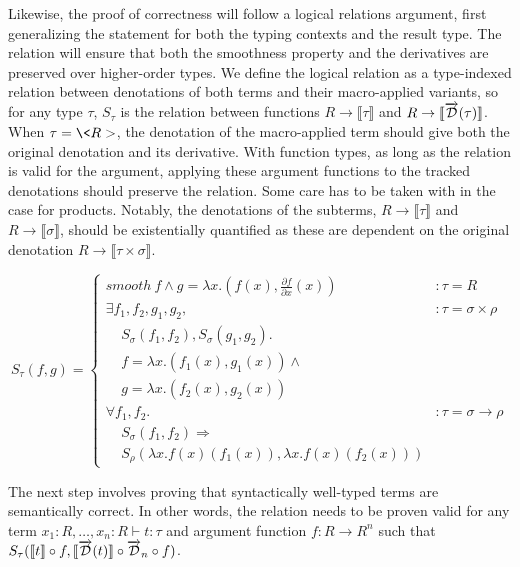   Likewise, the proof of correctness will follow a logical relations argument, first generalizing the statement for both the typing contexts and the result type.
  The relation will ensure that both the smoothness property and the derivatives are preserved over higher-order types.
  We define the logical relation as a type-indexed relation between denotations of both terms and their macro-applied variants, so for any type $\tau$, $S_\tau$ is the relation between functions $R \rightarrow \llbracket \tau \rrbracket$ and $R \rightarrow \llbracket \overrightarrow{\mathcal{D}}(\tau) \rrbracket$.
  When $\tau = \<R>$, the denotation of the macro-applied term should give both the original denotation and its derivative.
  With function types, as long as the relation is valid for the argument, applying these argument functions to the tracked denotations should preserve the relation.
  Some care has to be taken with in the case for products.
  Notably, the denotations of the subterms, $R \rightarrow \llbracket \tau \rrbracket$ and $R \rightarrow \llbracket \sigma \rrbracket$, should be existentially quantified as these are dependent on the original denotation $R \rightarrow \llbracket \tau \times \sigma \rrbracket$.

  \begin{equation}
    S_\tau(f, g) =
      \left\{
        \begin{array}{ll}
          smooth\ f \wedge
            g = \lambda x. (f(x), \frac{\partial f}{\partial x}(x))
            & : \tau = R \\
          \exists f_1, f_2, g_1, g_2,
            & : \tau = \sigma \times \rho \\
            \;\;\;\;S_\sigma(f_1, f_2), S_\sigma(g_1, g_2). \\
            \;\;\;\;f = \lambda x. (f_1(x), g_1(x)) \wedge \\
            \;\;\;\;g = \lambda x. (f_2(x), g_2(x)) \\
          \forall f_1, f_2.
            & : \tau = \sigma \rightarrow \rho \\
            \;\;\;\;S_\sigma(f_1, f_2) \Rightarrow \\
            \;\;\;\;S_\rho(\lambda x. f(x)(f_1(x)),\lambda x. f(x)(f_2(x)))
        \end{array}
      \right.
  \label{eqn:lr_base}
  \end{equation}

  The next step involves proving that syntactically well-typed terms are semantically correct.
  In other words, the relation needs to be proven valid for any term $x_1 : R, \dots, x_n : R \vdash t : \tau$ and argument function $f : R \rightarrow R^n$ such that $S_\tau(\llbracket t \rrbracket \circ f, \llbracket \overrightarrow{\mathcal{D}}(t) \rrbracket \circ \overrightarrow{\mathcal{D}}_n \circ f)$.

